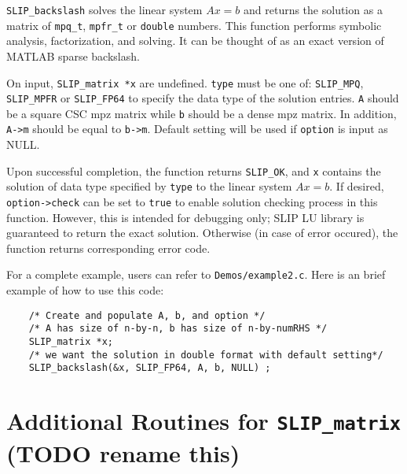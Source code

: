 \documentclass[12pt]{article}
\theoremstyle{definition}
\begin{document}
\verb|SLIP_backslash| solves the linear system $Ax=b$ and returns the solution
as a matrix of \verb|mpq_t|, \verb|mpfr_t| or \verb|double| numbers. This
function performs symbolic analysis, factorization, and solving. It can be
thought of as an exact version of MATLAB sparse backslash.

On input, \verb|SLIP_matrix *x| are undefined. \verb|type| must be one of:
\verb|SLIP_MPQ|, \verb|SLIP_MPFR| or \verb|SLIP_FP64| to specify the data type
of the solution entries. \verb|A| should be a square CSC mpz matrix while
\verb|b| should be a dense mpz matrix. In addition, \verb|A->m| should be equal
to \verb|b->m|.  Default setting will be used if \verb|option| is input as
NULL.

Upon successful completion, the function returns \verb|SLIP_OK|, and
\verb|x| contains the solution of data type specified by
\verb|type| to the linear system $Ax=b$. If desired, \verb|option->check| can
be set to \verb|true| to enable solution checking process in this function.
However, this is intended for debugging only; SLIP LU library is guaranteed to
return the exact solution. Otherwise (in case of error occured), the function
returns corresponding error code.

For a complete example, users can refer to \verb|Demos/example2.c|. Here is an
brief example of how to use this code:

{\small
\begin{verbatim}
    /* Create and populate A, b, and option */
    /* A has size of n-by-n, b has size of n-by-numRHS */
    SLIP_matrix *x;
    /* we want the solution in double format with default setting*/
    SLIP_backslash(&x, SLIP_FP64, A, b, NULL) ; \end{verbatim} }


























\cprotect\section{Additional Routines for \verb|SLIP_matrix| (TODO rename this)}
\label{s:SLIP_matrix_routine}
\end{document}

